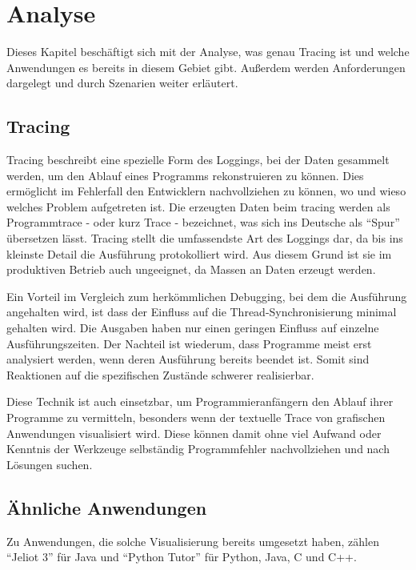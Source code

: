 
\chapter{Analyse}

Dieses Kapitel beschäftigt sich mit der Analyse, was genau Tracing ist und welche Anwendungen es bereits in diesem Gebiet gibt. Außerdem werden Anforderungen dargelegt und durch Szenarien weiter erläutert.

\section{Tracing} 

Tracing beschreibt eine spezielle Form des Loggings, bei der Daten gesammelt werden, um den Ablauf eines Programms rekonstruieren zu können. Dies ermöglicht im Fehlerfall den Entwicklern nachvollziehen zu können, wo und wieso welches Problem aufgetreten ist. Die erzeugten Daten beim tracing werden als Programmtrace - oder kurz Trace - bezeichnet, was sich ins Deutsche als "`Spur"' übersetzen lässt. Tracing stellt die umfassendste Art des Loggings dar, da bis ins kleinste Detail die Ausführung protokolliert wird. Aus diesem Grund ist sie im produktiven Betrieb auch ungeeignet, da Massen an Daten erzeugt werden.

Ein Vorteil im Vergleich zum herkömmlichen Debugging, bei dem die Ausführung angehalten wird, ist dass der Einfluss auf die Thread-Synchronisierung minimal gehalten wird. Die Ausgaben haben nur einen geringen Einfluss auf einzelne Ausführungszeiten. Der Nachteil ist wiederum, dass Programme meist erst analysiert werden, wenn deren Ausführung bereits beendet ist. Somit sind Reaktionen auf die spezifischen Zustände schwerer realisierbar.

Diese Technik ist auch einsetzbar, um Programmieranfängern den Ablauf ihrer Programme zu vermitteln, besonders wenn der textuelle Trace von grafischen Anwendungen visualisiert wird. Diese können damit ohne viel Aufwand oder Kenntnis der Werkzeuge selbständig Programmfehler nachvollziehen und nach Lösungen suchen.

\section{Ähnliche Anwendungen} 

Zu Anwendungen, die solche Visualisierung bereits umgesetzt haben, zählen "`Jeliot 3"' für Java und "`Python Tutor"' für Python, Java, C und C++.

